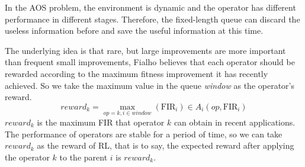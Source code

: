 \documentclass[journal]{IEEEtran}
\begin{document}
In the AOS problem, the environment is dynamic and the operator has different performance in different stages. Therefore, the fixed-length queue can discard the useless information before and save the useful information at this time.

The underlying idea is that rare, but large improvements are more important than frequent small improvements, Fialho \cite{fialho2010comparison} believes that each operator should be rewarded according to the maximum fitness improvement it has recently achieved.
So we take the maximum value in the queue \textit{window} as the operator's reward.
\begin{equation}
  reward_k = \max_{op=k, i\in \textit{window}}(\text{FIR}_i) \in A_i(op,\text{FIR}_i)
\end{equation}
$reward_k$ is the maximum FIR that operator $k$ can obtain in recent applications.
The performance of operators are stable for a period of time, so we can take $reward_k$ as the reward of RL, that is to say, the expected reward after applying the operator $k$ to the parent $i$ is $reward_k$.
\end{document}

